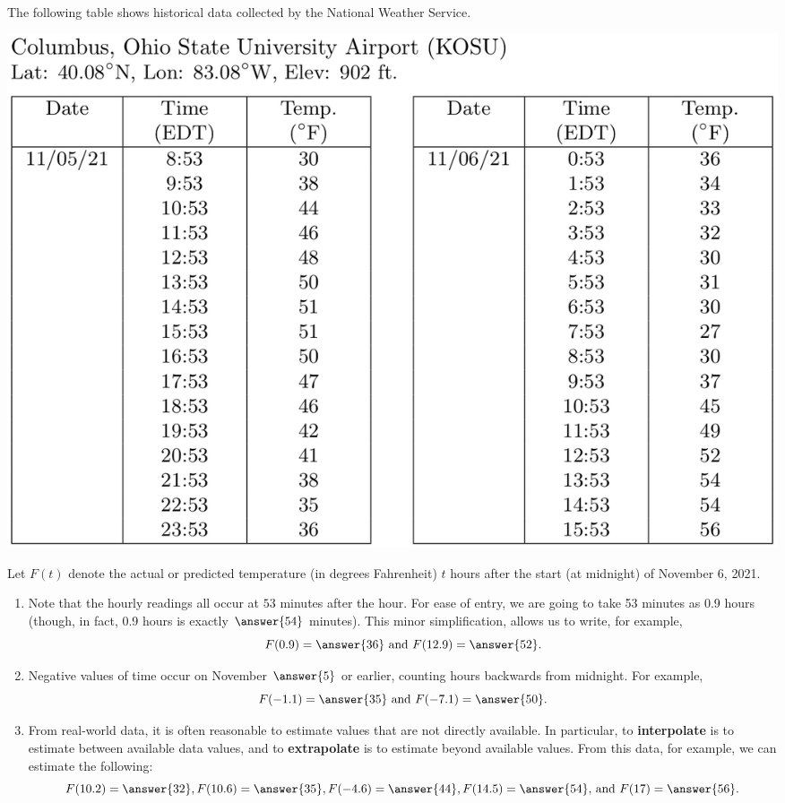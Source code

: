\documentclass[nooutcomes]{ximera}
\begin{document}
%
%
%


\begin{problem}
The following table shows historical data collected by the National Weather Service.  
\begin{image}
\includegraphics[scale=0.5]{columbusTemp1106.png}
\end{image}
Let $F(t)$ denote the actual or predicted temperature (in degrees Fahrenheit) $t$ hours after the start (at midnight) of November 6, 2021.  

\begin{enumerate}
\item Note that the hourly readings all occur at $53$ minutes after the hour.  For ease of entry, we are going to take 53 minutes as 0.9 hours (though, in fact, 0.9 hours is exactly $\answer{54}$ minutes).  This minor simplification, allows us to write, for example, 
\[
F(0.9) = \answer{36}\text{ and }F(12.9)=\answer{52}.  
\]
\item Negative values of time occur on November $\answer{5}$ or earlier, counting hours backwards from midnight.  For example, 
\[
F(-1.1) = \answer{35}\text{ and }F(-7.1)=\answer{50}.  
\]
\item From real-world data, it is often reasonable to estimate values that are not directly available.  In particular, to \textbf{interpolate} is to estimate between available data values, and to \textbf{extrapolate} is to estimate beyond available values. From this data, for example, we can estimate the following:  
\[
F(10.2)=\answer{32}, F(10.6)=\answer{35}, F(-4.6)=\answer{44}, F(14.5)=\answer{54}\text{, and }F(17)=\answer{56}.  
\]
\end{enumerate}


\end{problem}
\end{document}
